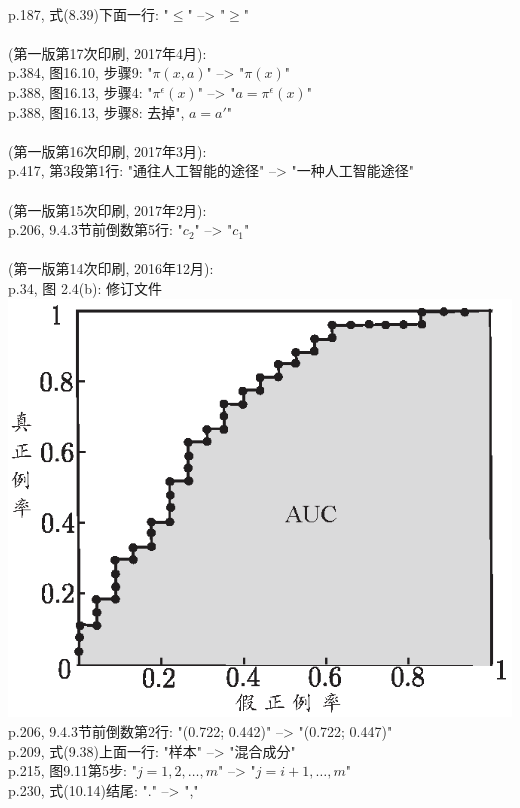 \documentclass[UTF8]{article}
\begin{document}
\\
p.187, 式(8.39)下面一行: "$\le$" --> "$\ge$" \\
\\
(第一版第17次印刷, 2017年4月):
\\
p.384, 图16.10, 步骤9: "$\pi(x, a)$" --> "$\pi(x)$" \\
p.388, 图16.13, 步骤4: "$\pi^{\epsilon}(x)$" --> "$a = \pi^{\epsilon}(x)$" \\
p.388, 图16.13, 步骤8: 去掉", $a = a'$" \\
\\
(第一版第16次印刷, 2017年3月):
\\
p.417, 第3段第1行: "通往人工智能的途径" --> "一种人工智能途径" \\
\\
(第一版第15次印刷, 2017年2月):
\\
p.206, 9.4.3节前倒数第5行: "$c_2$" --> "$c_1$" \\
\\
(第一版第14次印刷, 2016年12月):
\\
p.34, 图 2.4(b): 修订文件\\
\includegraphics{pic/mlbookfig24b.eps} \\
p.206, 9.4.3节前倒数第2行: "(0.722; 0.442)" --> "(0.722; 0.447)" \\
p.209, 式(9.38)上面一行: "样本" --> "混合成分" \\
p.215, 图9.11第5步: "$j = 1, 2, \ldots, m$" --> "$j = i+1, \ldots, m$" \\
p.230, 式(10.14)结尾: "." --> "," \\
\end{document}
